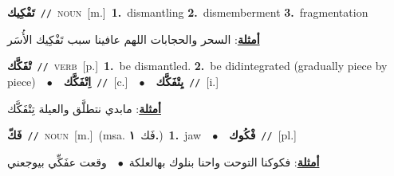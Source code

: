 \documentclass[10pt,a4paper,twoside]{article} %
\begin{document}
\begin{multicols}{2}
{\setlength\topsep{0pt}\textbf{\foreignlanguage{arabic}{تَفْكِيك}}\ {\color{gray}\texttt{//}\color{black}}\ \textsc{noun}\ [m.]\ \textbf{1.}~dismantling  \textbf{2.}~dismemberment  \textbf{3.}~fragmentation\  \begin{flushright}\color{gray}\foreignlanguage{arabic}{\textbf{\underline{\foreignlanguage{arabic}{أمثلة}}}: السحر والحجابات اللهم عافينا سبب تَفْكِيك الأُسَر}\end{flushright}\color{black}} \vspace{2mm}

{\setlength\topsep{0pt}\textbf{\foreignlanguage{arabic}{تْفَكَّك}}\ {\color{gray}\texttt{//}\color{black}}\ \textsc{verb}\ [p.]\ \textbf{1.}~be dismantled.  \textbf{2.}~be didintegrated (gradually piece by piece)\ \ $\bullet$\ \ \setlength\topsep{0pt}\textbf{\foreignlanguage{arabic}{اِتْفَكَّك}}\ {\color{gray}\texttt{//}\color{black}}\ [c.]\ \ $\bullet$\ \ \setlength\topsep{0pt}\textbf{\foreignlanguage{arabic}{يِتْفَكَّك}}\ {\color{gray}\texttt{//}\color{black}}\ [i.]\  \begin{flushright}\color{gray}\foreignlanguage{arabic}{\textbf{\underline{\foreignlanguage{arabic}{أمثلة}}}: مابدي نتطلَّق والعيلة تِتْفَكَّك}\end{flushright}\color{black}} \vspace{2mm}

{\setlength\topsep{0pt}\textbf{\foreignlanguage{arabic}{فَكّ}}\ {\color{gray}\texttt{//}\color{black}}\ \textsc{noun}\ [m.]\ \color{gray}(msa. \foreignlanguage{arabic}{فَك}~\foreignlanguage{arabic}{\textbf{١.}})\color{black}\ \textbf{1.}~jaw\ \ $\bullet$\ \ \setlength\topsep{0pt}\textbf{\foreignlanguage{arabic}{فْكُوك}}\ {\color{gray}\texttt{//}\color{black}}\ [pl.]\  \begin{flushright}\color{gray}\foreignlanguage{arabic}{\textbf{\underline{\foreignlanguage{arabic}{أمثلة}}}: فكوكنا التوحت واحنا بنلوك بهالعلكة\ $\bullet$\ \  وقعت عفَكِّي بيوجعني}\end{flushright}\color{black}} \vspace{2mm}


\end{multicols}
\end{document}
